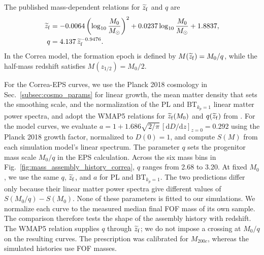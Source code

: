 \documentclass[
 reprint,
 superscriptaddress,
 nofootinbib,
 nobibnotes,
 amsmath,
 amssymb,
 aps,
 prd,
 floatfix,
 longbibliography
]{revtex4-2}
\DeclareRobustCommand{\change}[1]{#1}
\newcommand\Tk[1]{{\color{red} \bf #1}}
\DeclareRobustCommand{\BTKPone}{\ensuremath{\mathrm{BT}_{k_p=1}}}
\begin{document}
The published mass-dependent relations for \(\widetilde z_{\rm f}\) and \(q\) are
\begin{equation}
\begin{aligned}
\widetilde z_{\rm f}&=-0.0064\left(\log_{10}\frac{M_0}{M_\odot}\right)^2
+0.0237\log_{10}\frac{M_0}{M_\odot}+1.8837,\\
q&=4.137\,\widetilde z_{\rm f}^{-0.9476}.
\end{aligned}
\label{eq:correa_q_closure}
\end{equation}
\change{In the Correa model, the formation epoch is defined by \(M(\widetilde z_{\rm f})=M_0/q\), while the half-mass redshift satisfies \(M(z_{1/2})=M_0/2\).}

For the Correa-EPS curves, we use the Planck 2018 cosmology in Sec.~\ref{subsec:cosmo_params} for linear growth, the mean matter density that sets the smoothing scale, and the normalization of the PL and \BTKPone{} linear matter power spectra, and adopt the WMAP5 relations for \(\widetilde z_{\rm f}(M_0)\) and \(q(\widetilde z_{\rm f})\) from \citet{Correa2015MAHI}. For the model curves, we evaluate \(a=1+1.686\sqrt{2/\pi}\,[\mathrm{d}D/\mathrm{d}z]_{z=0}=0.292\) using the Planck 2018 growth factor, normalized to \(D(0)=1\), and compute \(S(M)\) from each simulation model's linear spectrum. The parameter \(q\) sets the progenitor mass scale \(M_0/q\) in the EPS calculation. Across the six mass bins in Fig.~\ref{fig:mass_assembly_history_correa}, \(q\) ranges from 2.68 to 3.20. At fixed \(M_0\), we use the same \(q\), \(\widetilde z_{\rm f}\), and \(a\) for PL and \BTKPone{}. The two predictions differ only because their linear matter power spectra give different values of \(S(M_0/q)-S(M_0)\). None of these parameters is fitted to our simulations. We normalize each curve to the measured median final FOF mass of its own sample. The comparison therefore tests the shape of the assembly history with redshift. The WMAP5 relation supplies \(q\) through \(\widetilde z_{\rm f}\); we do not impose a crossing at \(M_0/q\) on the resulting curves. The prescription was calibrated for \(M_{200c}\), whereas the simulated histories use FOF masses.
\end{document}
